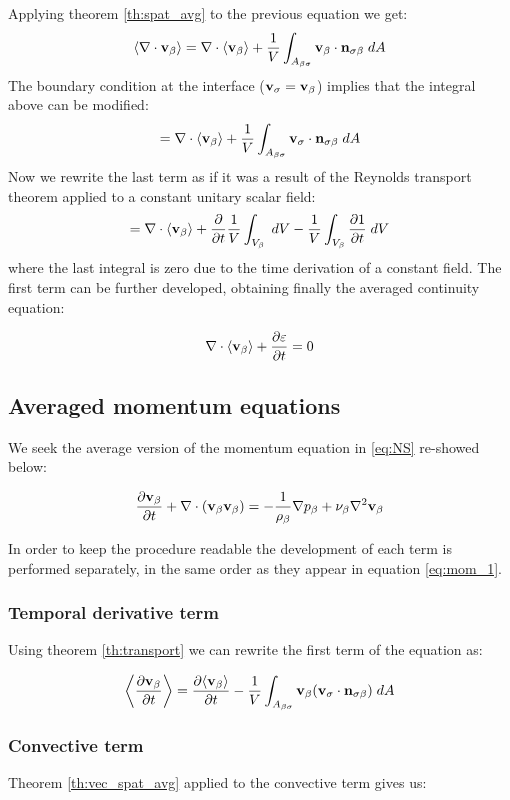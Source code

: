 Applying theorem \eqref{th:spat_avg} to the previous equation we get:
$$
{\left< \nabla \cdot \textbf{v}_{\beta} \right>} = \nabla \cdot {\left< \textbf{v}_{\beta}\right>} + \dfrac{1}{V} \int_{A_{\beta \sigma}}  \textbf{v}_{\beta} \cdot \mathbf{n}_{\sigma \beta} \;dA
$$
The boundary condition at the interface ($\textbf{v}_{\sigma} = \textbf{v}_{\beta}$) implies that the integral above can be modified: 
$$=\nabla \cdot {\left< \textbf{v}_{\beta}\right>} + \dfrac{1}{V} \int_{A_{\beta \sigma}}  \textbf{v}_{\sigma} \cdot \mathbf{n}_{\sigma \beta} \;dA$$
Now we rewrite the last term as if it was a result of the Reynolds transport theorem applied to a constant unitary scalar field:
$$=\nabla \cdot {\left< \textbf{v}_{\beta}\right>} + \dfrac{\partial }{\partial t} \dfrac{1}{V} \int_{V_\beta} \;dV  - \dfrac{1}{V} \int_{V_\beta} \dfrac{\partial 1}{\partial t} \;dV $$
where the last integral is zero due to the time derivation of a constant field. The first term can be further developed, obtaining finally the averaged continuity equation:

\begin{equation}
\nabla \cdot {\left< \textbf{v}_{\beta}\right>} + \dfrac{\partial \varepsilon}{\partial t} =0
\label{eq:avg_1}
\end{equation}


\subsection{Averaged momentum equations}
We seek the average version of the momentum equation in \eqref{eq:NS} re-showed below:

\begin{equation}
\dfrac{\partial \textbf{v}_{\beta}}{\partial t} + \nabla \cdot (\textbf{v}_{\beta}\textbf{v}_{\beta}) = -\frac{1}{\rho_{\beta}} \nabla p_{\beta} + \nu_{\beta} \nabla^2  \textbf{v}_{\beta}
\label{eq:mom_1}
\end{equation}

In order to keep the procedure readable the development of each term is performed separately, in the same order as they appear in equation \eqref{eq:mom_1}.

\subsubsection{Temporal derivative term}
Using theorem \eqref{th:transport} we can rewrite the first term of the equation as:

\begin{equation}
{\left< \dfrac{\partial \textbf{v}_{\beta}}{\partial t} \right>} = \dfrac{\partial {\left< \textbf{v}_{\beta}\right>}}{\partial t} -\dfrac{1}{V} \int_{A_{\beta \sigma}}  \textbf{v}_{\beta} (\textbf{v}_{\sigma} \cdot \mathbf{n}_{\sigma \beta} )\;dA
\end{equation}

\subsubsection{Convective term}
Theorem \eqref{th:vec_spat_avg} applied to the convective term gives us:

